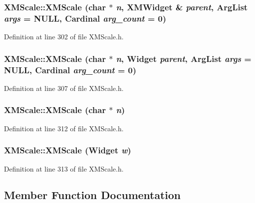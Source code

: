 \subsubsection{\setlength{\rightskip}{0pt plus 5cm}XMScale::XMScale (char $\ast$ {\em n}, {\bf XMWidget} \& {\em parent}, Arg\-List {\em args} = NULL, Cardinal {\em arg\_\-count} = 0)\hspace{0.3cm}{\tt  [inline]}}\label{classXMScale_a0}




Definition at line 302 of file XMScale.h.
\subsubsection{\setlength{\rightskip}{0pt plus 5cm}XMScale::XMScale (char $\ast$ {\em n}, Widget {\em parent}, Arg\-List {\em args} = NULL, Cardinal {\em arg\_\-count} = 0)\hspace{0.3cm}{\tt  [inline]}}\label{classXMScale_a1}




Definition at line 307 of file XMScale.h.
\subsubsection{\setlength{\rightskip}{0pt plus 5cm}XMScale::XMScale (char $\ast$ {\em n})\hspace{0.3cm}{\tt  [inline]}}\label{classXMScale_a2}




Definition at line 312 of file XMScale.h.
\subsubsection{\setlength{\rightskip}{0pt plus 5cm}XMScale::XMScale (Widget {\em w})\hspace{0.3cm}{\tt  [inline]}}\label{classXMScale_a3}




Definition at line 313 of file XMScale.h.

\subsection{Member Function Documentation}
